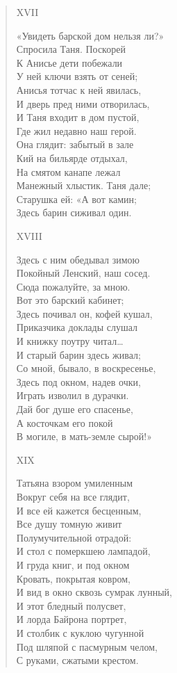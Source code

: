 \begin{verse}
XVII

«Увидеть барской дом нельзя ли?»\\
Спросила Таня. Поскорей\\
К Анисье дети побежали\\
У ней ключи взять от сеней;\\
Анисья тотчас к ней явилась,\\
И дверь пред ними отворилась,\\
И Таня входит в дом пустой,\\
Где жил недавно наш герой.\\
Она глядит: забытый в зале\\
Кий на бильярде отдыхал,\\
На смятом канапе лежал\\
Манежный хлыстик. Таня дале;\\
Старушка ей: «А вот камин;\\
Здесь барин сиживал один.

XVIII

Здесь с ним обедывал зимою\\
Покойный Ленский, наш сосед.\\
Сюда пожалуйте, за мною.\\
Вот это барский кабинет;\\
Здесь почивал он, кофей кушал,\\
Приказчика доклады слушал\\
И книжку поутру читал…\\
И старый барин здесь живал;\\
Со мной, бывало, в воскресенье,\\
Здесь под окном, надев очки,\\
Играть изволил в дурачки.\\
Дай бог душе его спасенье,\\
А косточкам его покой\\
В могиле, в мать-земле сырой!»

XIX

Татьяна взором умиленным\\
Вокруг себя на все глядит,\\
И все ей кажется бесценным,\\
Все душу томную живит\\
Полумучительной отрадой:\\
И стол с померкшею лампадой,\\
И груда книг, и под окном\\
Кровать, покрытая ковром,\\
И вид в окно сквозь сумрак лунный,\\
И этот бледный полусвет,\\
И лорда Байрона портрет,\\
И столбик с куклою чугунной\\
Под шляпой с пасмурным челом,\\
С руками, сжатыми крестом.


\end{verse}
